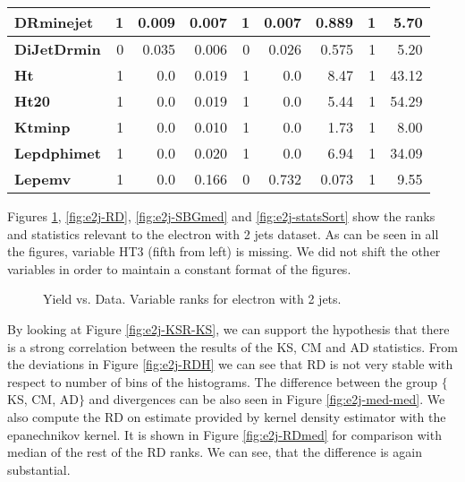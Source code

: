 \begin{table}[htbp]
\begin{center}
\begin{tabular}{|l|r|r|r|r|r|r|r|r|}
\textbf{DRminejet} & 1 & 0.009 & 0.007 & 1 & 0.007 & 0.889 & 1 & 5.70 \\ \hline
\textbf{DiJetDrmin} & 0 & 0.035 & 0.006 & 0 & 0.026 & 0.575 & 1 & 5.20 \\ \hline
\textbf{Ht} & 1 & 0.0 & 0.019 & 1 & 0.0 & 8.47 & 1 & 43.12 \\ \hline
\textbf{Ht20} & 1 & 0.0 & 0.019 & 1 & 0.0 & 5.44 & 1 & 54.29 \\ \hline
\textbf{Ktminp} & 1 & 0.0 & 0.010 & 1 & 0.0 & 1.73 & 1 & 8.00 \\ \hline
\textbf{Lepdphimet} & 1 & 0.0 & 0.020 & 1 & 0.0 & 6.94 & 1 & 34.09 \\ \hline
\textbf{Lepemv} & 1 & 0.0 & 0.166 & 0 & 0.732 & 0.073 & 1 & 9.55 \\ \hline
\end{tabular}
\end{center}
\label{tab:e2j-tests}
\end{table}

Figures \ref{fig:e2j-KSR}, \ref{fig:e2j-RD},  \ref{fig:e2j-SBGmed} and \ref{fig:e2j-statsSort} show the ranks and statistics relevant to the electron with 2 jets dataset. As can be seen in all the figures, variable HT3 (fifth from left) is missing. We did not shift the other variables in order to maintain a constant format of the figures. 

\begin{figure}[htb]
    \centering
	\quad
    \caption{Yield vs. Data. Variable ranks for electron with 2 jets.}
     \label{fig:e2j-KSR}
\end{figure}	

By looking at Figure \ref{fig:e2j-KSR-KS}, we can support the hypothesis that there is a strong correlation between the results of the KS, CM and AD statistics. From the deviations in Figure \ref{fig:e2j-RDH} we can see that RD is not very stable with respect to number of bins of the histograms. The difference between the group $\lbrace$KS, CM, AD$\rbrace$ and \ren divergences can be also seen in Figure \ref{fig:e2j-med-med}. We also compute the RD on estimate provided by kernel density estimator with the epanechnikov kernel. It is shown in Figure \ref{fig:e2j-RDmed} for comparison with median of the rest of the RD ranks. We can see, that the difference is again substantial. 

